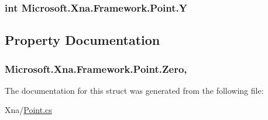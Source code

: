 \subsubsection[{Y}]{\setlength{\rightskip}{0pt plus 5cm}int Microsoft.\+Xna.\+Framework.\+Point.\+Y}\label{struct_microsoft_1_1_xna_1_1_framework_1_1_point_abb9c724b5024be2cb69bc8d19011d432}


\subsection{Property Documentation}
\hypertarget{struct_microsoft_1_1_xna_1_1_framework_1_1_point_a8c01cc21d9c61f3444b4e7c455b7cf7c}{}
\subsubsection[{Zero}]{ Microsoft.\+Xna.\+Framework.\+Point.\+Zero\hspace{0.3cm}{\ttfamily [static]}, {\ttfamily [get]}}\label{struct_microsoft_1_1_xna_1_1_framework_1_1_point_a8c01cc21d9c61f3444b4e7c455b7cf7c}


The documentation for this struct was generated from the following file\+:\begin{DoxyCompactItemize}
\item 
Xna/\hyperlink{_point_8cs}{Point.\+cs}\end{DoxyCompactItemize}

